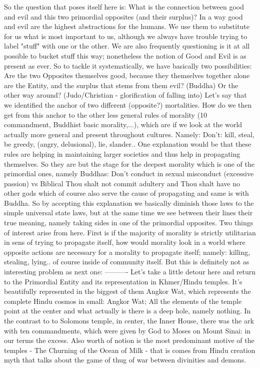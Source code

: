 \documentclass[10pt]{book}
\begin{document}
So the question that poses itself here is: What is the connection between good and evil and this two primordial opposites (and their surplus)?
In a way good and evil are the highest abstractions for the humans. We use them to substitute for us what is most important to us, although we always have trouble trying to label "stuff" with one or the other. We are also frequently questioning is it at all possible to bucket stuff this way; nonetheless the notion of Good and Evil is as present as ever. 
So to tackle it systematically, we have basically two possibilities: Are the two Opposites themselves good, because they themselves together alone are the Entity, and the surplus that stems from them evil? (Buddha) Or the other way around? (Judo/Christian - glorification of falling into)
Let's say that we identified the anchor of two different (opposite?) mortalities. How do we then get from this anchor to the other less general rules of morality (10 commandment, Buddhist basic morality,...), which are if we look at the world actually more general and present throughout cultures. Namely: Don't: kill, steal, be greedy, (angry, delusional), lie, slander.. One explanation would be that these rules are helping in maintaining larger societies and thus help in propagating themselves. So they are but the stage for the deepest morality which is one of the primordial ones, namely Buddhas: Don't conduct in sexual misconduct (excessive passion) vs Biblical Thou shalt not commit adultery and Thou shalt have no other gods which of course also serve the cause of propagating and same is with Buddha.
So by accepting this explanation we basically diminish those laws to the simple universal state laws, but at the same time we see between their lines their true meaning, namely taking sides in one of the primordial opposites. Two things of interest arise from here. First is if the majority of morality is strictly utilitarian in sens of trying to propagate itself, how would morality look in a world where opposite actions are necessary for a morality to propagate itself; namely: killing, stealing, lying.. of course inside of community itself. But this is definitely not as interesting problem as next one: 
----------
Let's take a little detour here and return to the Primordial Entity and its representation in Khmer/Hindu temples. It's beautifully represented in the biggest of them Angkor Wat, which represents the complete Hindu cosmos in small: Angkor Wat; All the elements of the temple point at the center and what actually is there is a deep hole, namely nothing. In the contrast to to Solomons temple, in center, the Inner House, there was the ark with ten commandments, which were given by God to Moses on Mount Sinai: in our terms the excess. Also worth of notion is the most predominant motive of the temples - The Churning of the Ocean of Milk - that is comes from Hindu creation myth that talks about the game of thug of war between divinities and demons.
\end{document}
